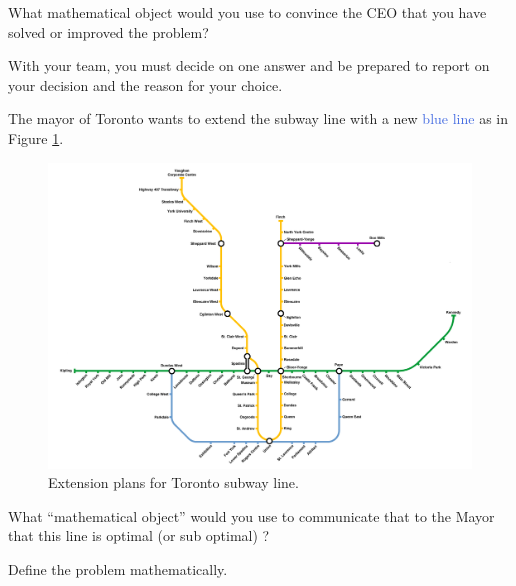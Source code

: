 What mathematical object would you use to convince the CEO that you have solved or improved the problem?

\begin{teamwork}
	With your team, you must decide on one answer and be prepared to report on your decision and the reason for your choice.	
\end{teamwork}

\bookonlynewpage








\question
The mayor of Toronto wants to extend the subway line with a new \textcolor{RoyalBlue}{blue line} as in Figure \ref{TTC}.
	
	\begin{center}
	\begin{figure}[!htbp]
	\includegraphics*[width=500pt]{images/TTC-extension.png}
	\caption{Extension plans for Toronto subway line.}
	\label{TTC}	
	\end{figure}
	\end{center}
	
\begin{parts}
	\item What ``mathematical object'' would you use to communicate that to the Mayor that this line is optimal (or sub optimal) ?

	\item Define the problem mathematically.
\end{parts}

















